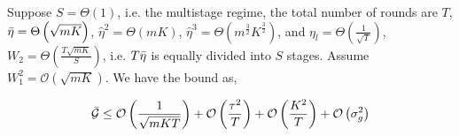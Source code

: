 \begin{corollary}
Suppose $S=\Theta(1)$, i.e. the multistage regime, the total number of rounds are $T$, $\Bar{\eta} = \Theta\left(\sqrt{mK}\right)$, $\hat{\eta}^2 = \Theta\left(mK\right)$, $\hat{\eta}^3 = \Theta\left(m^{\frac{3}{2}} K^{\frac{3}{2}}\right)$, and  $\eta_l=\Theta\left(\frac{1}{\sqrt{T}}\right)$, $W_2=\Theta\left(\frac{T\sqrt{mK}}{S}\right)$, i.e. $T\Bar{\eta}$ is equally divided into $S$ stages. Assume $W_1^2=\mathcal{O}\left(\sqrt{mK}\right)$. We have the bound as,

\begin{equation}
\begin{gathered}
 \Bar{\mathcal{G}}  
\leq \mathcal{O}\left(\frac{1}{\sqrt{mKT}}\right)+ \mathcal{O}\left(\frac{\tau^2}{T}\right) +  \mathcal{O}\left( \frac{K^2}{T} \right) + \mathcal{O}\left( \sigma_g^2 \right)
\end{gathered}\nonumber
\end{equation}


\end{corollary}

